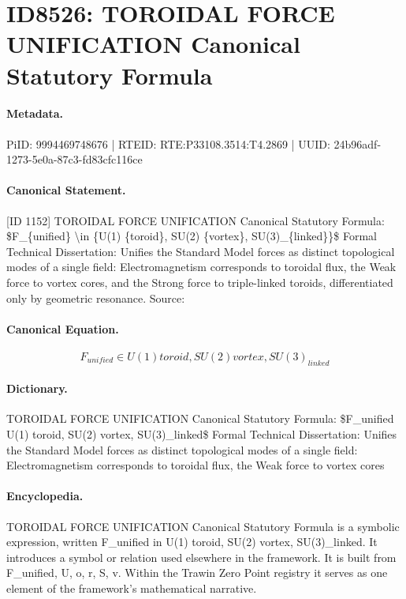 \section*{ID8526: TOROIDAL FORCE UNIFICATION Canonical Statutory Formula}
\paragraph{Metadata.}
PiID: 9994469748676 | RTEID: RTE:P33108.3514:T4.2869 | UUID: 24b96adf-1273-5e0a-87c3-fd83cfc116ce

\paragraph{Canonical Statement.}
[ID 1152] TOROIDAL FORCE UNIFICATION Canonical Statutory Formula: \$F\_\{unified\} \textbackslash{}in \{U(1) \{toroid\}, SU(2) \{vortex\}, SU(3)\_\{linked\}\}\$ Formal Technical Dissertation: Unifies the Standard Model forces as distinct topological modes of a single field: Electromagnetism corresponds to toroidal flux, the Weak force to vortex cores, and the Strong force to triple-linked toroids, differentiated only by geometric resonance. Source:

\paragraph{Canonical Equation.}
\[
F_{unified} \in {U(1) {toroid}, SU(2) {vortex}, SU(3)_{linked}}
\]

\paragraph{Dictionary.}
TOROIDAL FORCE UNIFICATION Canonical Statutory Formula: \$F\_unified U(1) toroid, SU(2) vortex, SU(3)\_linked\$ Formal Technical Dissertation: Unifies the Standard Model forces as distinct topological modes of a single field: Electromagnetism corresponds to toroidal flux, the Weak force to vortex cores

\paragraph{Encyclopedia.}
TOROIDAL FORCE UNIFICATION Canonical Statutory Formula is a symbolic expression, written F\_unified in U(1) toroid, SU(2) vortex, SU(3)\_linked. It introduces a symbol or relation used elsewhere in the framework. It is built from F\_unified, U, o, r, S, v. Within the Trawin Zero Point registry it serves as one element of the framework's mathematical narrative.
